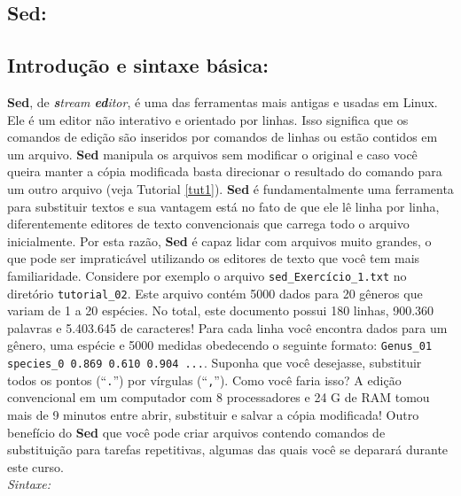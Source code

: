 \begin{refsection}

\section{Sed:}\label{tut2:sed}

\subsection{Introdução e sintaxe básica:}\label{tut2:sed:intro}

	\textbf{Sed}, de \textit{\textbf{s}tream \textbf{ed}itor}, é uma das ferramentas mais antigas e usadas em Linux. Ele é um editor não interativo e orientado por linhas. Isso significa que os comandos de edição são inseridos por comandos de linhas ou estão contidos em um arquivo. \textbf{Sed} manipula os arquivos sem modificar o original e caso você queira manter a cópia modificada basta direcionar o resultado do comando para um outro arquivo (veja Tutorial \ref{tut1}). \textbf{Sed} é fundamentalmente uma ferramenta para substituir textos e sua vantagem está no fato de que ele lê linha por linha, diferentemente editores de texto convencionais que carrega todo o arquivo inicialmente. Por esta razão, \textbf{Sed} é capaz lidar com arquivos muito grandes, o que pode ser impraticável utilizando os editores de texto que você tem mais familiaridade. Considere por exemplo o arquivo \texttt{sed\_Exercício\_1.txt} no diretório \texttt{tutorial\_02}. Este arquivo contém 5000 dados para 20 gêneros que variam de 1 a 20 espécies. No total, este documento possui 180 linhas, 900.360 palavras e 5.403.645 de caracteres! Para cada linha você encontra dados para um gênero, uma espécie e 5000 medidas obedecendo o seguinte formato: \texttt{Genus\_01 species\_0	0.869	0.610	0.904	...}. Suponha que você desejasse, substituir todos os pontos (``\texttt{.}'') por vírgulas (``\texttt{,}''). Como você faria isso? A edição convencional em um computador com 8 processadores e 24 G de RAM tomou mais de 9 minutos entre abrir, substituir e salvar a cópia modificada! Outro benefício do \textbf{Sed} que você pode criar arquivos contendo comandos de substituição para tarefas repetitivas, algumas das quais você se deparará durante este curso.\\

\textit{Sintaxe:}\\
 \\


\end{refsection}
